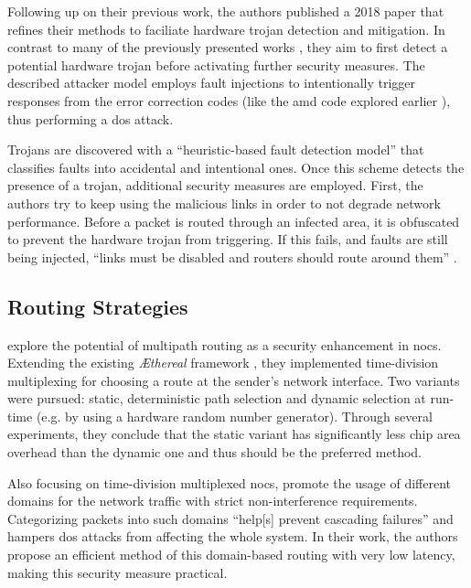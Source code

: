 Following up on their previous work, the authors published a 2018 paper \cite{boraten18mitigationdos} that refines their methods to faciliate hardware
trojan detection and mitigation. In contrast to many of the previously presented works \cites(e.g.)(){ancajas14fortnocs}{frey17hardenednoc}, they aim
to first detect a potential hardware trojan before activating further security measures. The described attacker model employs fault injections to
intentionally trigger responses from the error correction codes (like the \gls{amd} code explored earlier \cite{boraten16packetsecurity}), thus
performing a \gls{dos} attack.

Trojans are discovered with a \enquote{heuristic-based fault detection model} \cite[25]{boraten18mitigationdos} that classifies faults into accidental
and intentional ones. Once this scheme detects the presence of a trojan, additional security measures are employed. First, the authors try to keep
using the malicious links in order to not degrade network performance. Before a packet is routed through an infected area, it is obfuscated to prevent
the hardware trojan from triggering. If this fails, and faults are still being injected, \enquote{links must be disabled and routers should route
around them} \cite[32]{boraten18mitigationdos}.

\subsection{Routing Strategies}
\citeauthor{stefan11enhancingnocs} \cite{stefan11enhancingnocs} explore the potential of multipath routing as a security enhancement in \glspl{noc}.
Extending the existing \textit{\AE thereal} framework \cite{goossens05aethereal}, they implemented time-division multiplexing for choosing a route at
the sender's network interface. Two variants were pursued: static, deterministic path selection and dynamic selection at run-time (e.g. by using a
hardware random number generator). Through several experiments, they conclude that the static variant has significantly less chip area overhead than
the dynamic one and thus should be the preferred method.

Also focusing on time-division multiplexed \glspl{noc}, \citeauthor{wassel13surfnoc} \cite{wassel13surfnoc} promote the usage of different domains for
the network traffic with strict non-interference requirements. Categorizing packets into such domains \enquote{help[s] prevent cascading failures}
\cite[1]{wassel13surfnoc} and hampers \gls{dos} attacks from affecting the whole system. In their work, the authors propose an efficient method of
this domain-based routing with very low latency, making this security measure practical.

